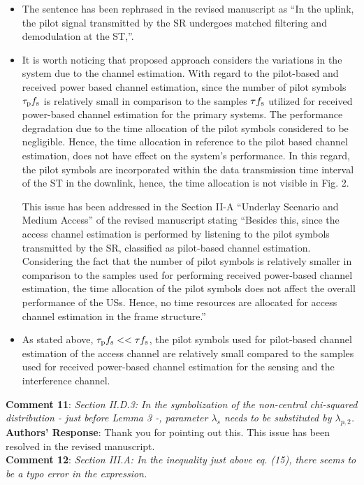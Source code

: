 \documentclass[12pt,a4wide,peerreview]{IEEEtran}
\newcommand{\tc}[1]{#1}
\begin{document}
\begin{itemize}
\item The sentence has been rephrased in the revised manuscript as ``In the uplink, the pilot signal transmitted by the SR undergoes matched filtering and demodulation at the ST,''. 
\item It is worth noticing that proposed approach considers the variations in the system due to the channel estimation. With regard to the pilot-based and received power based channel estimation, since the number of pilot symbols $\tau_{\text{p}}{f_{\text{s}}}$ is relatively small in comparison to the samples $\tau f_{\text{s}}$ utilized for received power-based channel estimation for the primary systems. The performance degradation due to the time allocation of the pilot symbols considered to be negligible. Hence, the time allocation in reference to the pilot based channel estimation, does not have effect on the system's performance. In this regard, the pilot symbols are incorporated within the data transmission time interval of the ST in the downlink, hence, the time allocation is not visible in Fig. 2. 

This issue has been addressed in the Section II-A ``Underlay Scenario and Medium Access'' of the revised manuscript stating ``Besides this, since the access channel estimation is performed by listening to the pilot symbols transmitted by the SR, classified as pilot-based channel estimation. Considering the fact that the number of pilot symbols is relatively smaller in comparison to the samples used for performing received power-based channel estimation, the time allocation of the pilot symbols does not affect the overall performance of the USs. Hence, no time resources are allocated for access channel estimation in the frame structure.''
\item As stated above, $\tau_{\text{p}}{f_{\text{s}}} << \tau f_{\text{s}}$, the pilot symbols used for pilot-based channel estimation of the access channel are relatively small compared to the samples used for received power-based channel estimation for the sensing and the interference channel. 
\end{itemize}
\textbf{\tc{Comment 11}}: 
\textit{
Section II.D.3: In the symbolization of the non-central chi-squared distribution - just before Lemma 3 -, parameter $\lambda_s$ needs to be substituted by $\lambda_{p,2}$.
}
\\
\textbf{Authors' Response}:
Thank you for pointing out this. This issue has been resolved in the revised manuscript. 
\\
\textbf{\tc{Comment 12}}: 
\textit{
Section III.A: In the inequality just above eq. (15), there seems to be a typo error in the expression.
}
\end{document}
